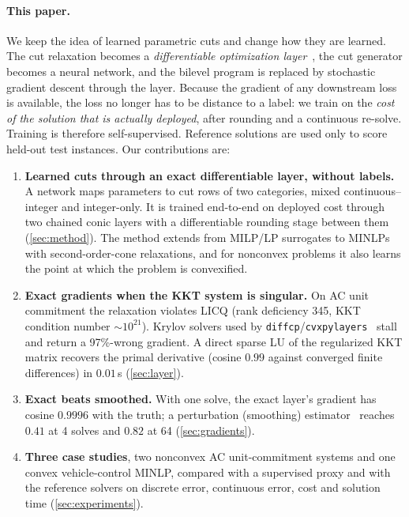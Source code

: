 \documentclass[10pt]{article}
\begin{document}
\paragraph{This paper.}
We keep the idea of learned parametric cuts and change how they are learned.
The cut relaxation becomes a \emph{differentiable optimization layer}~\citep{amos2017optnet,agrawal2019cvxpylayers}, the cut generator becomes a neural network, and the bilevel program is replaced by stochastic gradient descent through the layer.
Because the gradient of any downstream loss is available, the loss no longer has to be distance to a label: we train on the \emph{cost of the solution that is actually deployed}, after rounding and a continuous re-solve.
Training is therefore self-supervised.
Reference solutions are used only to score held-out test instances.
Our contributions are:
\begin{enumerate}
\item \textbf{Learned cuts through an exact differentiable layer, without labels.} A network maps parameters to cut rows of two categories, mixed continuous--integer and integer-only. It is trained end-to-end on deployed cost through two chained conic layers with a differentiable rounding stage between them (\cref{sec:method}). The method extends from MILP/LP surrogates to MINLPs with second-order-cone relaxations, and for nonconvex problems it also learns the point at which the problem is convexified.
\item \textbf{Exact gradients when the KKT system is singular.} On AC unit commitment the relaxation violates LICQ (rank deficiency 345, KKT condition number $\sim\!10^{21}$). Krylov solvers used by \texttt{diffcp}/\texttt{cvxpylayers}~\citep{agrawal2019diffcp} stall and return a 97\%-wrong gradient. A direct sparse LU of the regularized KKT matrix recovers the primal derivative (cosine $0.99$ against converged finite differences) in $0.01$\,s (\cref{sec:layer}).
\item \textbf{Exact beats smoothed.} With one solve, the exact layer's gradient has cosine $0.9996$ with the truth; a perturbation (smoothing) estimator~\citep{berthet2020perturbed} reaches $0.41$ at 4 solves and $0.82$ at 64 (\cref{sec:gradients}).
\item \textbf{Three case studies}, two nonconvex AC unit-commitment systems and one convex vehicle-control MINLP, compared with a supervised proxy and with the reference solvers on discrete error, continuous error, cost and solution time (\cref{sec:experiments}).
\end{enumerate}
\end{document}
